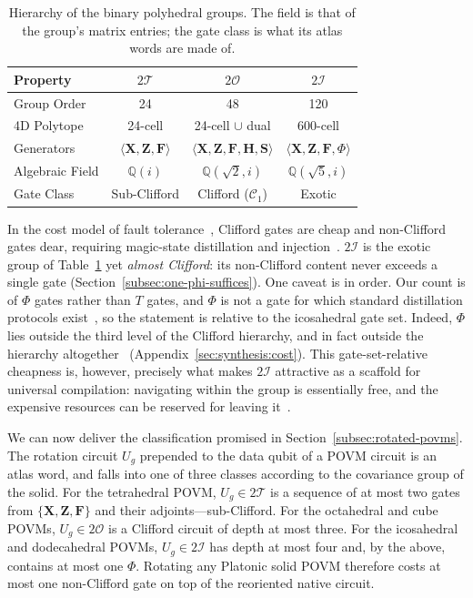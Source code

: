 \documentclass[11pt, oneside, openany]{scrbook}
\newcommand{\Tgroup}{\mathcal{T}}  %
\newcommand{\Ogroup}{\mathcal{O}}  %
\newcommand{\Igroup}{\mathcal{I}}  %
\newcommand{\TwoT}{2\Tgroup}
\newcommand{\TwoO}{2\Ogroup}
\newcommand{\TwoI}{2\Igroup}
\begin{document}
\begin{table}[htbp]
\centering
\begin{tabular}{@{} l c c c @{}}
\toprule
\textbf{Property} & $\TwoT$ & $\TwoO$ & $\TwoI$ \\
\midrule
Group Order & 24 & 48 & 120 \\
4D Polytope & 24-cell & 24-cell $\cup$ dual & 600-cell \\
Generators & $\langle \mathbf{X}, \mathbf{Z}, \mathbf{F} \rangle$ & $\langle \mathbf{X}, \mathbf{Z}, \mathbf{F}, \mathbf{H}, \mathbf{S} \rangle$ & $\langle \mathbf{X}, \mathbf{Z}, \mathbf{F}, \Phi \rangle$ \\
Algebraic Field & $\mathbb{Q}(i)$ & $\mathbb{Q}(\sqrt{2}, i)$ & $\mathbb{Q}(\sqrt{5}, i)$ \\
Gate Class & Sub-Clifford & Clifford ($\mathcal{C}_1$) & Exotic \\
\bottomrule
\end{tabular}
\caption{Hierarchy of the binary polyhedral groups. The field is that of the group's matrix entries; the gate class is what its atlas words are made of.}
\label{tab:complexity_hierarchy}
\end{table}

In the cost model of fault tolerance~\cite{gottesman2010introductionquantumerror}, Clifford gates are cheap and non-Clifford gates dear, requiring magic-state distillation and injection~\cite{bravyi2005universalquantumcomputation,campbell2017roadsfaulttolerantuniversal}. $\TwoI$ is the exotic group of Table~\ref{tab:complexity_hierarchy} yet \textit{almost Clifford}: its non-Clifford content never exceeds a single gate (Section~\ref{subsec:one-phi-suffices}). One caveat is in order. Our count is of $\Phi$ gates rather than $T$ gates, and $\Phi$ is not a gate for which standard distillation protocols exist~\cite{kubischta2026flexiblefaulttolerantgate}, so the statement is relative to the icosahedral gate set. Indeed, $\Phi$ lies outside the third level of the Clifford hierarchy, and in fact outside the hierarchy altogether~\cite{kubischta2023familyquantumcodes} (Appendix~\ref{sec:synthesis:cost}). This gate-set-relative cheapness is, however, precisely what makes $\TwoI$ attractive as a scaffold for universal compilation: navigating within the group is essentially free, and the expensive resources can be reserved for leaving it~\cite{blackman2022fastnavigationicosahedral}.

We can now deliver the classification promised in Section~\ref{subsec:rotated-povms}. The rotation circuit $U_g$ prepended to the data qubit of a POVM circuit is an atlas word, and falls into one of three classes according to the covariance group of the solid. For the tetrahedral POVM, $U_g \in \TwoT$ is a sequence of at most two gates from $\{\mathbf{X}, \mathbf{Z}, \mathbf{F}\}$ and their adjoints---sub-Clifford. For the octahedral and cube POVMs, $U_g \in \TwoO$ is a Clifford circuit of depth at most three. For the icosahedral and dodecahedral POVMs, $U_g \in \TwoI$ has depth at most four and, by the above, contains at most one $\Phi$. Rotating any Platonic solid POVM therefore costs at most one non-Clifford gate on top of the reoriented native circuit.
\end{document}
